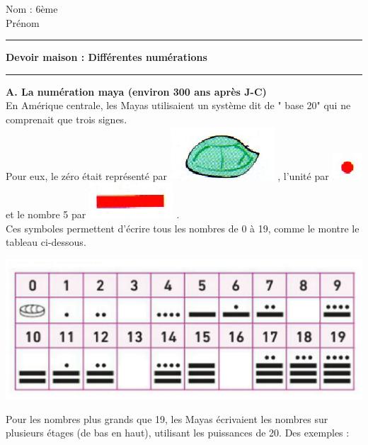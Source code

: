 \documentclass[a4paper,11pt]{article}
\newcommand{\titre}[5] 
{
\noindent #2 \hfill #4 \\
#3 \hfill #5

\vspace{-1.6cm}

\begin{center}\rule{6cm}{0.5mm}\end{center}
\vspace{0.2cm}
\begin{center}{\large{\textbf{#1}}}\end{center}
\begin{center}\rule{6cm}{0.5mm}\end{center}
}
\begin{document}
\pagestyle{empty}
\titre{Devoir maison : Différentes numérations}{Nom :}{Prénom}{6ème}{}

\vspace*{0.3cm}
\textbf{{\large A. La numération maya (environ 300 ans après J-C)}}\\

En Amérique centrale, les Mayas utilisaient un système dit de " base 20" qui ne comprenait que trois signes.\\

Pour eux, le zéro était représenté par \includegraphics[scale=0.5]{maya1.eps} , l'unité par \includegraphics[scale=0.55]{maya3.eps} et le nombre 5 par \includegraphics[scale=0.55]{maya2.eps} .\\
Ces symboles permettent d'écrire tous les nombres de 0 à 19, comme le montre le tableau ci-dessous.

\begin{center}
\includegraphics[scale=0.75]{maya4.eps} 
\end{center}


Pour les nombres plus grands que 19, les Mayas écrivaient les nombres sur plusieurs étages (de bas en haut), utilisant les puissances de 20. Des exemples :\\
\end{document}

